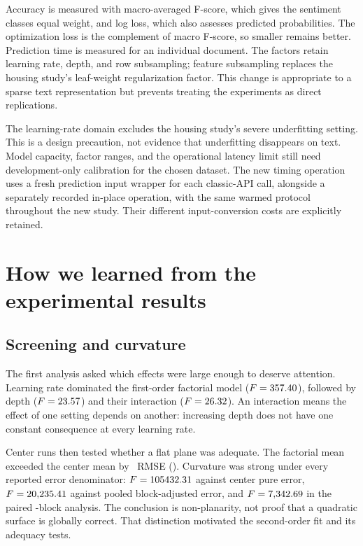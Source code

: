 \documentclass[12pt,a4paper]{article}
\begin{document}
Accuracy is measured with macro-averaged F-score, which gives the sentiment classes equal weight, and log loss, which also assesses predicted probabilities. The optimization loss is the complement of macro F-score, so smaller remains better. Prediction time is measured for an individual document. The factors retain learning rate, depth, and row subsampling; feature subsampling replaces the housing study's leaf-weight regularization factor. This change is appropriate to a sparse text representation but prevents treating the experiments as direct replications.

The learning-rate domain excludes the housing study's severe underfitting setting. This is a design precaution, not evidence that underfitting disappears on text. Model capacity, factor ranges, and the operational latency limit still need development-only calibration for the chosen dataset. The new timing operation uses a fresh prediction input wrapper for each classic-API call, alongside a separately recorded in-place operation, with the same warmed protocol throughout the new study. Their different input-conversion costs are explicitly retained.

\section{How we learned from the experimental results}
\subsection{Screening and curvature}
The first analysis asked which effects were large enough to deserve attention. Learning rate dominated the first-order factorial model ($F=357.40$), followed by depth ($F=23.57$) and their interaction ($F=26.32$). An interaction means the effect of one setting depends on another: increasing depth does not have one constant consequence at every learning rate.

Center runs then tested whether a flat plane was adequate. The factorial mean exceeded the center mean by \numDiffCurv\ RMSE (\numCurvPctIncrease). Curvature was strong under every reported error denominator: $F=105432.31$ against center pure error, $F=20{,}235.41$ against pooled block-adjusted error, and $F=7{,}342.69$ in the paired \numPubBlocks{}-block analysis. The conclusion is non-planarity, not proof that a quadratic surface is globally correct. That distinction motivated the second-order fit and its adequacy tests.
\end{document}
